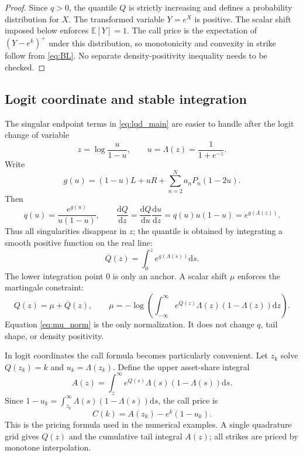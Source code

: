 \documentclass[11pt]{article}
\newcommand{\E}{\mathbb{E}}
\newcommand{\dd}{\mathrm{d}}
\newcommand{\1}{\mathbf{1}}
\begin{document}
\begin{proof}
Since $q>0$, the quantile $Q$ is strictly increasing and defines a probability distribution for $X$.  The transformed variable $Y=e^X$ is positive.  The scalar shift imposed below enforces $\E[Y]=1$.  The call price is the expectation of $(Y-e^k)^+$ under this distribution, so monotonicity and convexity in strike follow from \eqref{eq:BL}.  No separate density-positivity inequality needs to be checked.
\end{proof}

\subsection{Logit coordinate and stable integration}

The singular endpoint terms in \eqref{eq:lqd_main} are easier to handle after the logit change of variable
\begin{equation}
    z=\log\frac{u}{1-u},\qquad u=\Lambda(z)=\frac{1}{1+e^{-z}}.
\end{equation}
Write
\begin{equation}
    g(u)=(1-u)L+uR+\sum_{n=2}^{N}a_nP_n(1-2u). \label{eq:g_def}
\end{equation}
Then
\begin{equation}
    q(u)=\frac{e^{g(u)}}{u(1-u)},
    \qquad
    \frac{\dd Q}{\dd z}=\frac{\dd Q}{\dd u}\frac{\dd u}{\dd z}=q(u)u(1-u)=e^{g(\Lambda(z))}. \label{eq:q_logit}
\end{equation}
Thus all singularities disappear in $z$; the quantile is obtained by integrating a smooth positive function on the real line:
\begin{equation}
    \overline Q(z)=\int_0^z e^{g(\Lambda(s))}\dd s. \label{eq:qbar}
\end{equation}
The lower integration point $0$ is only an anchor.  A scalar shift $\mu$ enforces the martingale constraint:
\begin{equation}
    Q(z)=\mu+\overline Q(z), \qquad
    \mu=-\log\left(\int_{-\infty}^{\infty} e^{\overline Q(z)}\Lambda(z)(1-\Lambda(z))\dd z\right). \label{eq:mu_norm}
\end{equation}
Equation \eqref{eq:mu_norm} is the only normalization.  It does not change $q$, tail shape, or density positivity.

In logit coordinates the call formula becomes particularly convenient.  Let $z_k$ solve $Q(z_k)=k$ and $u_k=\Lambda(z_k)$.  Define the upper asset-share integral
\begin{equation}
    A(z)=\int_z^{\infty}e^{Q(s)}\Lambda(s)(1-\Lambda(s))\dd s. \label{eq:asset_share}
\end{equation}
Since $1-u_k=\int_{z_k}^{\infty}\Lambda(s)(1-\Lambda(s))\dd s$, the call price is
\begin{equation}
    C(k)=A(z_k)-e^k(1-u_k). \label{eq:call_logit}
\end{equation}
This is the pricing formula used in the numerical examples.  A single quadrature grid gives $Q(z)$ and the cumulative tail integral $A(z)$; all strikes are priced by monotone interpolation.
\end{document}
